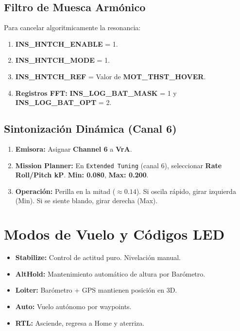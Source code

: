 \documentclass[11pt,a4paper]{article}
\begin{document}
\subsection{Filtro de Muesca Armónico}
Para cancelar algoritmicamente la resonancia:
\begin{enumerate}[leftmargin=*,noitemsep]
    \item \textbf{INS\_HNTCH\_ENABLE} = 1.
    \item \textbf{INS\_HNTCH\_MODE} = 1.
    \item \textbf{INS\_HNTCH\_REF} = Valor de \textbf{MOT\_THST\_HOVER}.
    \item \textbf{Registros FFT:} \textbf{INS\_LOG\_BAT\_MASK} = 1 y \textbf{INS\_LOG\_BAT\_OPT} = 2.
\end{enumerate}

\subsection{Sintonización Dinámica (Canal 6)}
\begin{enumerate}[leftmargin=*,noitemsep]
    \item \textbf{Emisora:} Asignar \textbf{Channel 6} a \textbf{VrA}.
    \item \textbf{Mission Planner:} En \texttt{Extended Tuning} (canal 6), seleccionar \textbf{Rate Roll/Pitch kP}. \textbf{Min: 0.080}, \textbf{Max: 0.200}.
    \item \textbf{Operación:} Perilla en la mitad ($\approx 0.14$). Si oscila rápido, girar izquierda (Min). Si se siente blando, girar derecha (Max).
\end{enumerate}

\section{Modos de Vuelo y Códigos LED}
\begin{itemize}[leftmargin=*,noitemsep]
    \item \textbf{Stabilize:} Control de actitud puro. Nivelación manual.
    \item \textbf{AltHold:} Mantenimiento automático de altura por Barómetro.
    \item \textbf{Loiter:} Barómetro + GPS mantienen posición en 3D.
    \item \textbf{Auto:} Vuelo autónomo por waypoints.
    \item \textbf{RTL:} Asciende, regresa a Home y aterriza.
\end{itemize}
\end{document}
